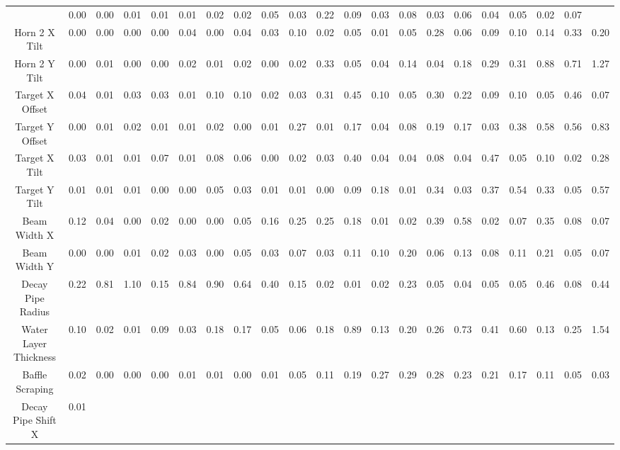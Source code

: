 \begin{sidewaystable}[ht]
\begin{tabular}{|c | c c c c c c c c c c c c c c c c c c c c | }
 & 0.00
 & 0.00
 & 0.01
 & 0.01
 & 0.01
 & 0.02
 & 0.02
 & 0.05
 & 0.03
 & 0.22
 & 0.09
 & 0.03
 & 0.08
 & 0.03
 & 0.06
 & 0.04
 & 0.05
 & 0.02
 & 0.07
\\
Horn 2 X Tilt & 0.00
 & 0.00
 & 0.00
 & 0.00
 & 0.04
 & 0.00
 & 0.04
 & 0.03
 & 0.10
 & 0.02
 & 0.05
 & 0.01
 & 0.05
 & 0.28
 & 0.06
 & 0.09
 & 0.10
 & 0.14
 & 0.33
 & 0.20
\\
Horn 2 Y Tilt & 0.00
 & 0.01
 & 0.00
 & 0.00
 & 0.02
 & 0.01
 & 0.02
 & 0.00
 & 0.02
 & 0.33
 & 0.05
 & 0.04
 & 0.14
 & 0.04
 & 0.18
 & 0.29
 & 0.31
 & 0.88
 & 0.71
 & 1.27
\\
Target X Offset & 0.04
 & 0.01
 & 0.03
 & 0.03
 & 0.01
 & 0.10
 & 0.10
 & 0.02
 & 0.03
 & 0.31
 & 0.45
 & 0.10
 & 0.05
 & 0.30
 & 0.22
 & 0.09
 & 0.10
 & 0.05
 & 0.46
 & 0.07
\\
Target Y Offset & 0.00
 & 0.01
 & 0.02
 & 0.01
 & 0.01
 & 0.02
 & 0.00
 & 0.01
 & 0.27
 & 0.01
 & 0.17
 & 0.04
 & 0.08
 & 0.19
 & 0.17
 & 0.03
 & 0.38
 & 0.58
 & 0.56
 & 0.83
\\
Target X Tilt & 0.03
 & 0.01
 & 0.01
 & 0.07
 & 0.01
 & 0.08
 & 0.06
 & 0.00
 & 0.02
 & 0.03
 & 0.40
 & 0.04
 & 0.04
 & 0.08
 & 0.04
 & 0.47
 & 0.05
 & 0.10
 & 0.02
 & 0.28
\\
Target Y Tilt & 0.01
 & 0.01
 & 0.01
 & 0.00
 & 0.00
 & 0.05
 & 0.03
 & 0.01
 & 0.01
 & 0.00
 & 0.09
 & 0.18
 & 0.01
 & 0.34
 & 0.03
 & 0.37
 & 0.54
 & 0.33
 & 0.05
 & 0.57
\\
Beam Width X & 0.12
 & 0.04
 & 0.00
 & 0.02
 & 0.00
 & 0.00
 & 0.05
 & 0.16
 & 0.25
 & 0.25
 & 0.18
 & 0.01
 & 0.02
 & 0.39
 & 0.58
 & 0.02
 & 0.07
 & 0.35
 & 0.08
 & 0.07
\\
Beam Width Y & 0.00
 & 0.00
 & 0.01
 & 0.02
 & 0.03
 & 0.00
 & 0.05
 & 0.03
 & 0.07
 & 0.03
 & 0.11
 & 0.10
 & 0.20
 & 0.06
 & 0.13
 & 0.08
 & 0.11
 & 0.21
 & 0.05
 & 0.07
\\
Decay Pipe Radius & 0.22
 & 0.81
 & 1.10
 & 0.15
 & 0.84
 & 0.90
 & 0.64
 & 0.40
 & 0.15
 & 0.02
 & 0.01
 & 0.02
 & 0.23
 & 0.05
 & 0.04
 & 0.05
 & 0.05
 & 0.46
 & 0.08
 & 0.44
\\
Water Layer Thickness & 0.10
 & 0.02
 & 0.01
 & 0.09
 & 0.03
 & 0.18
 & 0.17
 & 0.05
 & 0.06
 & 0.18
 & 0.89
 & 0.13
 & 0.20
 & 0.26
 & 0.73
 & 0.41
 & 0.60
 & 0.13
 & 0.25
 & 1.54
\\
Baffle Scraping & 0.02
 & 0.00
 & 0.00
 & 0.00
 & 0.01
 & 0.01
 & 0.00
 & 0.01
 & 0.05
 & 0.11
 & 0.19
 & 0.27
 & 0.29
 & 0.28
 & 0.23
 & 0.21
 & 0.17
 & 0.11
 & 0.05
 & 0.03
\\
Decay Pipe Shift X & 0.01

\end{tabular}
\end{sidewaystable}
